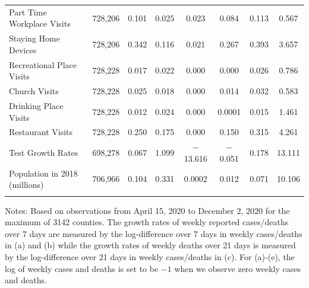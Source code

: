 \documentclass[9pt,twoside,lineno]{pnas-new}
\theoremstyle{definition}
\begin{document}
\begin{table}[!ht]
{\begin{minipage}{\linewidth}
\begin{tabular}{@{\extracolsep{5pt}}lccccccc}
Part Time Workplace Visits & 728,206 & 0.101 & 0.025 & 0.023 & 0.084 & 0.113 & 0.567 \\ 
Staying Home Devices & 728,206 & 0.342 & 0.116 & 0.021 & 0.267 & 0.393 & 3.657 \\ 
Recreational Place Visits & 728,228 & 0.017 & 0.022 & 0.000 & 0.000 & 0.026 & 0.786 \\ 
Church Visits & 728,228 & 0.025 & 0.018 & 0.000 & 0.014 & 0.032 & 0.583 \\ 
Drinking Place Visits & 728,228 & 0.012 & 0.024 & 0.000 & 0.0001 & 0.015 & 1.461 \\ 
Restaurant Visits & 728,228 & 0.250 & 0.175 & 0.000 & 0.150 & 0.315 & 4.261 \\ 
Test Growth Rates& 698,278 & 0.067 & 1.099 & $-$13.616 & $-$0.051 & 0.178 & 13.111 \\ 
Population in 2018 (millions) & 706,966 & 0.104 & 0.331 & 0.0002 & 0.012 & 0.071 & 10.106 \\ 
 \hline \\[-1.8ex] 
\end{tabular} 
  {\scriptsize
\begin{flushleft}
Notes:  Based on observations from April 15, 2020 to December 2, 2020 for the maximum of 3142 counties. The growth rates of weekly reported cases/deaths over 7 days are measured by the log-difference over 7 days in weekly cases/deaths in (a) and (b) while the growth rates of weekly deaths over 21 days is measured by the log-difference over 21 days in weekly cases/deaths in (c). For (a)-(e),  the log of weekly cases and deaths is set to be $-1$ when we observe zero weekly cases and deaths. 
\end{flushleft}}   
 \end{minipage}}
\end{table}


   
 
\end{document}
